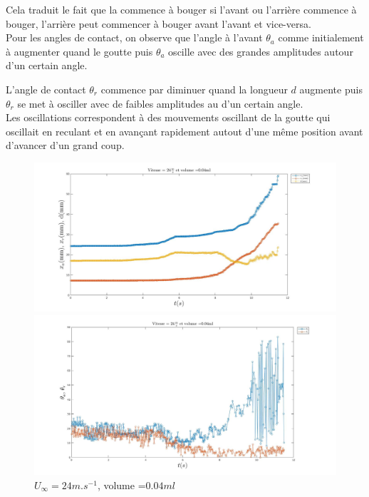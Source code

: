 Cela traduit le fait que la commence à bouger si l'avant ou l'arrière commence à bouger, l'arrière peut commencer à bouger avant l'avant et vice-versa.\\

Pour les angles de contact, on observe que l'angle à l'avant $\theta_{a}$ comme initialement à augmenter quand le goutte puis $\theta_{a}$ oscille avec des grandes amplitudes autour d'un certain angle.

L'angle de contact $\theta_{r}$ commence par diminuer quand la longueur $d$ augmente puis $\theta_{r}$ se met à osciller avec de faibles amplitudes au d'un certain angle.\\

Les oscillations correspondent à des mouvements oscillant de la goutte qui oscillait en reculant et en avançant rapidement autout d'une même position avant d'avancer d'un grand coup.

\newpage
\begin{figure}[!ht]
	\centering
	\begin{minipage}{0.95\linewidth}
		\includegraphics[width=\linewidth]{./image/v=24_vol=004_xaxrd.jpg}
		\caption{$\textcolor{blue}{x_{a}}$,
		$\textcolor{red}{x_{r}}$, $\textcolor{yellow}{d}$}
		\label{fig:entre_xaxrd}
	\end{minipage}
	\vfill
	\begin{minipage}{0.95\linewidth}
		\includegraphics[width=\linewidth]{./image/v=24_vol=004_oaor.jpg}
		\caption{$\textcolor{blue}{\theta_{a}}$,
		$\textcolor{red}{\theta_{r}}$}
		\label{fig:entre_oaor}
	\end{minipage}
	\caption{$U_{\infty}=24m.s^{-1}$, volume =$0.04ml$}
 \end{figure}


